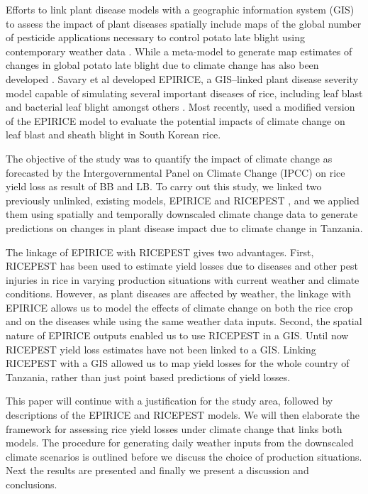     Efforts to link plant disease models with a geographic information system (GIS) to assess the impact of plant diseases spatially include maps of the global number of pesticide applications necessary to control potato late blight using contemporary weather data \citep{Hijmans2000}. While a meta-model to generate map estimates of changes in global potato late blight due to climate change has also been developed \citep{Sparks2014}. Savary et al developed EPIRICE, a GIS--linked plant disease severity model capable of simulating several important diseases of rice, including leaf blast and bacterial leaf blight amongst others \citep{Savary2012}. Most recently, \citep{Kim2015} used a modified version of the EPIRICE model to evaluate the potential impacts of climate change on leaf blast and sheath blight in South Korean rice.
    
    The objective of the study was to quantify the impact of climate change as forecasted by the Intergovernmental Panel on Climate Change (IPCC) on rice yield loss as result of BB and LB. To carry out this study, we linked two previously unlinked, existing models, EPIRICE and RICEPEST \citep{Willocquet2000,Willocquet2002}, and we applied them using spatially and temporally downscaled climate change data to generate predictions on changes in plant disease impact due to climate change in Tanzania.
    
    The linkage of EPIRICE with RICEPEST gives two advantages. First, RICEPEST has been used to estimate yield losses due to diseases and other pest injuries in rice in varying production situations with current weather and climate conditions. However, as plant diseases are affected by weather, the linkage with EPIRICE allows us to model the effects of climate change on both the rice crop and on the diseases while using the same weather data inputs. Second, the spatial nature of EPIRICE outputs enabled us to use RICEPEST in a GIS. Until now RICEPEST yield loss estimates have not been linked to a GIS. Linking RICEPEST with a GIS allowed us to map yield losses for the whole country of Tanzania, rather than just point based predictions of yield losses.
    
    This paper will continue with a justification for the study area, followed by descriptions of the EPIRICE and RICEPEST models. We will then elaborate the framework for assessing rice yield losses under climate change that links both models. The procedure for generating daily weather inputs from the downscaled climate scenarios is outlined before we discuss the choice of production situations. Next the results are presented and finally we present a discussion and conclusions.
    
